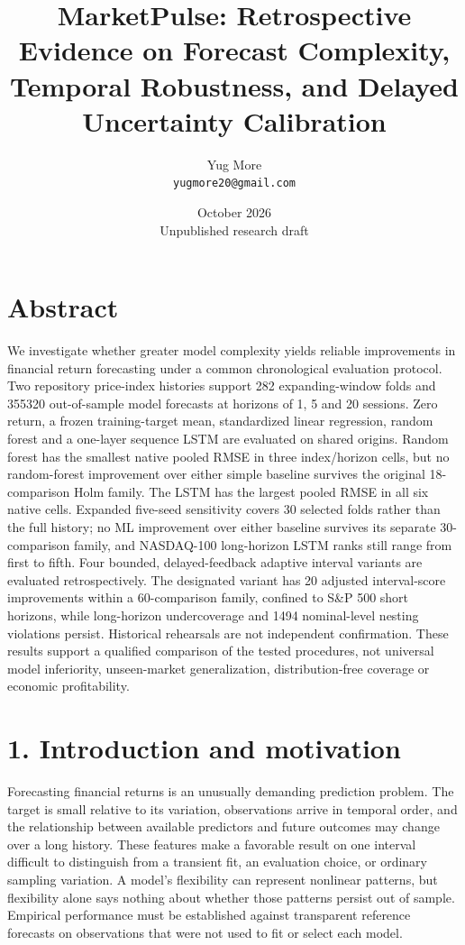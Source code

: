 \documentclass[11pt]{article}
\title{MarketPulse: Retrospective Evidence on Forecast Complexity, Temporal Robustness, and Delayed Uncertainty Calibration}
\author{Yug More\\\texttt{yugmore20@gmail.com}}
\date{October 2026\\Unpublished research draft}
\begin{document}
\maketitle

\section*{Abstract}

We investigate whether greater model complexity yields reliable improvements in financial return forecasting under a common chronological evaluation protocol. Two repository price-index histories support 282 expanding-window folds and 355320 out-of-sample model forecasts at horizons of 1, 5 and 20 sessions. Zero return, a frozen training-target mean, standardized linear regression, random forest and a one-layer sequence LSTM are evaluated on shared origins. Random forest has the smallest native pooled RMSE in three index/horizon cells, but no random-forest improvement over either simple baseline survives the original 18-comparison Holm family. The LSTM has the largest pooled RMSE in all six native cells. Expanded five-seed sensitivity covers 30 selected folds rather than the full history; no ML improvement over either baseline survives its separate 30-comparison family, and NASDAQ-100 long-horizon LSTM ranks still range from first to fifth. Four bounded, delayed-feedback adaptive interval variants are evaluated retrospectively. The designated variant has 20 adjusted interval-score improvements within a 60-comparison family, confined to S\&P 500 short horizons, while long-horizon undercoverage and 1494 nominal-level nesting violations persist. Historical rehearsals are not independent confirmation. These results support a qualified comparison of the tested procedures, not universal model inferiority, unseen-market generalization, distribution-free coverage or economic profitability.

\section*{1. Introduction and motivation}

Forecasting financial returns is an unusually demanding prediction problem. The target is small relative to its variation, observations arrive in temporal order, and the relationship between available predictors and future outcomes may change over a long history. These features make a favorable result on one interval difficult to distinguish from a transient fit, an evaluation choice, or ordinary sampling variation. A model's flexibility can represent nonlinear patterns, but flexibility alone says nothing about whether those patterns persist out of sample. Empirical performance must be established against transparent reference forecasts on observations that were not used to fit or select each model.
\end{document}
